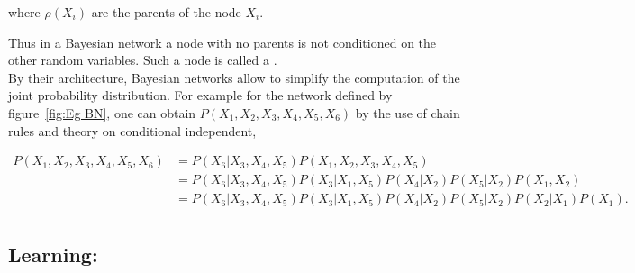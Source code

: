 \documentclass[a4paper,11pt]{report}
\begin{document}
{\begin{prop}
				where $\rho(X_{i})$ are the parents of the node $X_{i}$. 
				\label{pty:CI for BNs}
			\end{prop}
			
			Thus in a Bayesian network a node with no parents is not conditioned on the other random variables. Such a node is called a .\\

			By their architecture, Bayesian networks allow to simplify the computation of the joint probability distribution. For example for the network defined by figure~\ref{fig:Eg BN}, one can obtain $P(X_{1},X_{2},X_{3},X_{4},X_{5},X_{6})$ by the use of chain rules and theory on conditional independent,
			
			\begin{equation*}
			  \begin{split}
			    P(X_{1},X_{2},X_{3},X_{4},X_{5},X_{6})
						&= P(X_{6} | X_{3},X_{4},X_{5}) P(X_{1},X_{2},X_{3},X_{4},X_{5}) \\
						&= P(X_{6} | X_{3},X_{4},X_{5}) P(X_{3} | X_{1},X_{5}) P(X_{4}| X_{2}) P(X_{5}| X_{2}) P(X_{1},X_{2})\\
						&= P(X_{6} | X_{3},X_{4},X_{5}) P(X_{3} | X_{1},X_{5}) P(X_{4}| X_{2}) P(X_{5}| X_{2}) P(X_{2}|X_{1}) P(X_{1}).\\
			  \end{split}
			  \label{eq:Eg BN CI}
			\end{equation*}
      

    \subsection{Learning:}
      \label{subsec:PGMs/BN/Learning}
      
}
\end{document}
